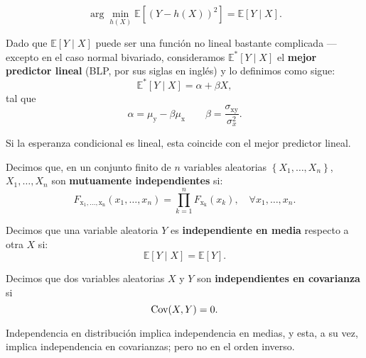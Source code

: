 \documentclass[8pt,a4paper]{extarticle}
\begin{document}
\begin{multicols}{3}
	\begin{boxprop}[]
		\[
			\arg\min_{h(X)} \mathbb{E}\left[ \left( Y - h(X) \right)^2  \right] = \mathbb{E}\left[ Y  \mid X \right]
			.\]
	\end{boxprop}

	\begin{boxdef}
		Dado que $\mathbb{E}[Y  \mid X]$ puede ser una función no lineal bastante complicada --- excepto en el caso normal bivariado, consideramos $\mathbb{E}^* [Y  \mid X]$ el \textbf{mejor predictor lineal} (BLP, por sus siglas en inglés) y lo definimos como sigue:
		\[
			\mathbb{E}^*\left[ Y  \mid X \right] = \alpha + \beta X
			,\]
		tal que
		\[
			\alpha = \mu_{\mathrm{y}} - \beta \mu_{\mathrm{x}} \qquad \beta = \frac{\sigma_{\mathrm{xy}}}{\sigma^2_{x}}
			.\]
	\end{boxdef}

	\begin{boxtheo}[]
		Si la esperanza condicional es lineal, esta coincide con el mejor predictor lineal.
	\end{boxtheo}

	\sectionbreak

	\begin{boxdef}
		Decimos que, en un conjunto finito de $n$ variables aleatorias $\left\{ X_1, \ldots, X_n \right\}$, $X_1, \ldots, X_n$ son \textbf{mutuamente independientes} si:
		\[
			F_{\mathrm{x_1,\ldots,x_n}} (x_1, \ldots, x_n) = \prod_{k=1}^{n} F_{\mathrm{x_k}} (x_k), \quad \forall x_1, \ldots, x_n
			.\]
	\end{boxdef}

	\begin{boxdef}
		Decimos que una variable aleatoria $Y$ es \textbf{independiente en media} respecto a otra $X$ si:
		\[
			\mathbb{E}[Y  \mid X] = \mathbb{E}[Y]
			.\]
	\end{boxdef}

	\begin{boxdef}
		Decimos que dos variables aleatorias $X$ y $Y$ son \textbf{independientes en covarianza} si
		\[
			\text{\normalfont Cov}(X,Y) = 0
			.\]
	\end{boxdef}

	\begin{boxtheo}[]
		Independencia en distribución implica independencia en medias, y esta, a su vez, implica independencia en covarianzas; pero no en el orden inverso.
	\end{boxtheo}


\end{multicols}
\end{document}
